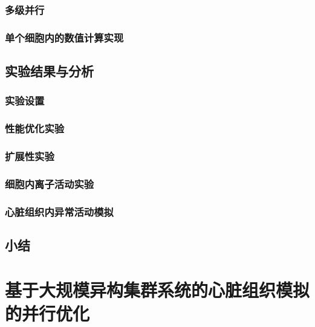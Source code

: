  \subsection{多级并行}
 
 \subsection{单个细胞内的数值计算实现}




\section{实验结果与分析}
\subsection{实验设置}

\subsection{性能优化实验}

\subsection{扩展性实验}

\subsection{细胞内离子活动实验}

\subsection{心脏组织内异常活动模拟}

\section{小结}



















\chapter{基于大规模异构集群系统的心脏组织模拟的并行优化}
\label{chapbmvc1}

